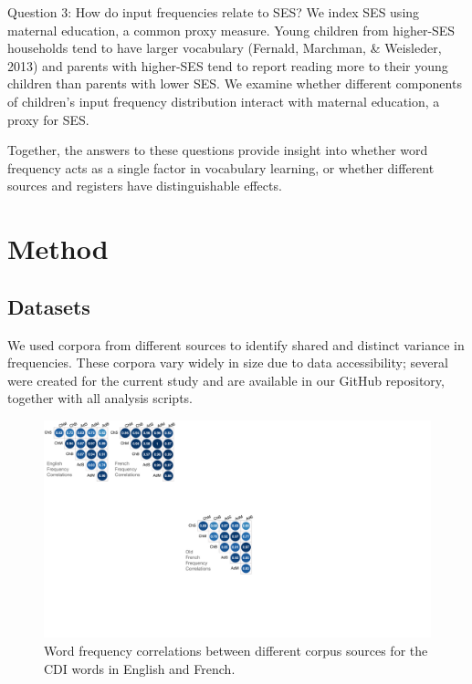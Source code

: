 \documentclass[10pt, letterpaper]{article}
\newenvironment{CodeChunk}{}{}
\begin{document}
Question 3: How do input frequencies relate to SES? We index SES using
maternal education, a common proxy measure. Young children from
higher-SES households tend to have larger vocabulary (Fernald, Marchman,
\& Weisleder, 2013) and parents with higher-SES tend to report reading
more to their young children than parents with lower SES. We examine
whether different components of children's input frequency distribution
interact with maternal education, a proxy for SES.

Together, the answers to these questions provide insight into whether
word frequency acts as a single factor in vocabulary learning, or
whether different sources and registers have distinguishable effects.

\hypertarget{method}{%
\section{Method}\label{method}}

\hypertarget{datasets}{%
\subsection{Datasets}\label{datasets}}

We used corpora from different sources to identify shared and distinct
variance in frequencies. These corpora vary widely in size due to data
accessibility; several were created for the current study and are
available in our GitHub repository, together with all analysis scripts.

\begin{CodeChunk}
\begin{figure}[t]

{\centering \includegraphics[width=\linewidth]{figs/corpus_freq_cors_hor} 

}

\caption[Word frequency correlations between different corpus sources for the CDI words in English and French]{Word frequency correlations between different corpus sources for the CDI words in English and French.}\label{fig:fig1}
\end{figure}
\end{CodeChunk}
\end{document}
